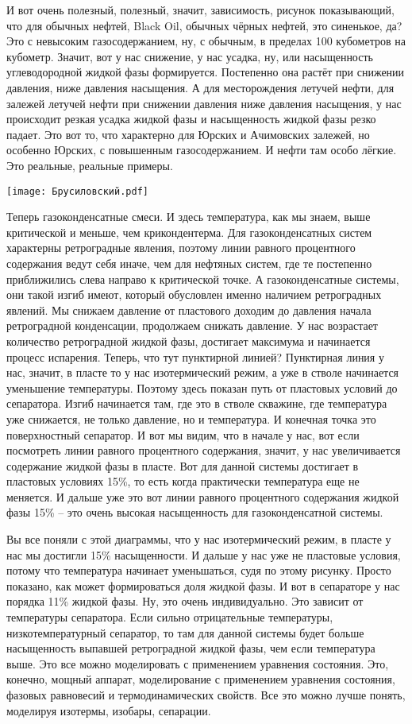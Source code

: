 \documentclass[main.tex]{subfiles}
\begin{document}
И вот очень полезный, полезный, значит, зависимость, рисунок показывающий, что для обычных нефтей, Black Oil, обычных чёрных нефтей, это синенькое, да?
Это с невысоким газосодержанием, ну, с обычным, в пределах 100 кубометров на кубометр.
Значит, вот у нас снижение, у нас усадка, ну, или насыщенность углеводородной жидкой фазы формируется.
Постепенно она растёт при снижении давления, ниже давления насыщения.
А для месторождения летучей нефти, для залежей летучей нефти при снижении давления ниже давления насыщения, у нас происходит резкая усадка жидкой фазы и насыщенность жидкой фазы резко падает.
Это вот то, что характерно для Юрских и Ачимовских залежей, но особенно Юрских, с повышенным газосодержанием.
И нефти там особо лёгкие. Это реальные, реальные примеры.

\begin{center}
\texttt{[image: Брусиловский.pdf]}
\end{center}

Теперь газоконденсатные смеси.
И здесь температура, как мы знаем, выше критической и меньше, чем крикондентерма.
Для газоконденсатных систем характерны ретроградные явления, поэтому линии равного процентного содержания ведут себя иначе, чем для нефтяных систем, где те постепенно приближились слева направо к критической точке.
А газоконденсатные системы, они такой изгиб имеют, который обусловлен именно наличием ретроградных явлений.
Мы снижаем давление от пластового доходим до давления начала ретроградной конденсации, продолжаем снижать давление.
У нас возрастает количество ретроградной жидкой фазы, достигает максимума и начинается процесс испарения.
Теперь, что тут пунктирной линией?
Пунктирная линия у нас, значит, в пласте то у нас изотермический режим, а уже в стволе начинается уменьшение температуры.
Поэтому здесь показан путь от пластовых условий до сепаратора.
Изгиб начинается там, где это в стволе скважине, где температура уже снижается, не только давление, но и температура.
И конечная точка это поверхностный сепаратор.
И вот мы видим, что в начале у нас, вот если посмотреть линии равного процентного содержания, значит, у нас увеличивается содержание жидкой фазы в пласте.
Вот для данной системы достигает в пластовых условиях 15\%, то есть когда практически температура еще не меняется.
И дальше уже это вот линии равного процентного содержания жидкой фазы 15\% -- это очень высокая насыщенность для газоконденсатной системы.

Вы все поняли с этой диаграммы, что у нас изотермический режим, в пласте у нас мы достигли 15\% насыщенности.
И дальше у нас уже не пластовые условия, потому что температура начинает уменьшаться, судя по этому рисунку.
Просто показано, как может формироваться доля жидкой фазы.
И вот в сепараторе у нас порядка 11\% жидкой фазы.
Ну, это очень индивидуально.
Это зависит от температуры сепаратора.
Если сильно отрицательные температуры, низкотемпературный сепаратор, то там для данной системы будет больше насыщенность выпавшей ретроградной жидкой фазы, чем если температура выше.
Это все можно моделировать с применением уравнения состояния.
Это, конечно, мощный аппарат, моделирование с применением уравнения состояния, фазовых равновесий и термодинамических свойств.
Все это можно лучше понять, моделируя изотермы, изобары, сепарации.
\end{document}
